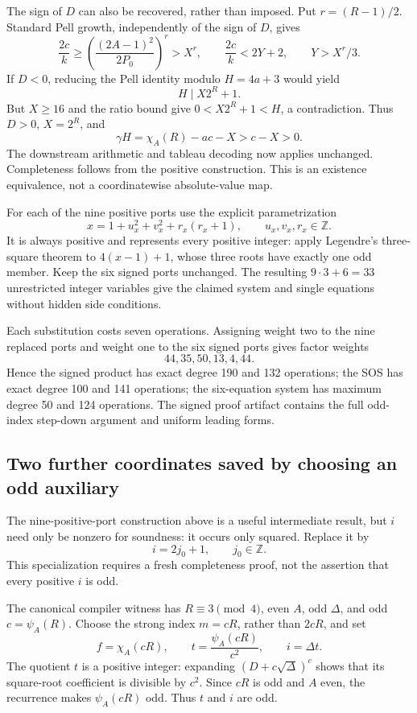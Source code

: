 \documentclass[11pt]{article}
\begin{document}
The sign of $D$ can also be recovered, rather than imposed. Put $r=(R-1)/2$. Standard Pell growth, independently of the sign of $D$, gives
\[
\frac{2c}{k}\ge
\left(\frac{(2A-1)^2}{2P_0}\right)^r>X^r,
\qquad \frac{2c}{k}<2Y+2,
\qquad Y>X^r/3.
\]
If $D<0$, reducing the Pell identity modulo $H=4a+3$ would yield
\[
H\mid X2^R+1.
\]
But $X\ge16$ and the ratio bound give $0<X2^R+1<H$, a contradiction. Thus $D>0$, $X=2^R$, and
\[
\gamma H=\chi_A(R)-ac-X>c-X>0.
\]
The downstream arithmetic and tableau decoding now applies unchanged. Completeness follows from the positive construction. This is an existence equivalence, not a coordinatewise absolute-value map.

For each of the nine positive ports use the explicit parametrization
\[
x=1+u_x^2+v_x^2+r_x(r_x+1),\qquad u_x,v_x,r_x\in\mathbb Z.
\]
It is always positive and represents every positive integer: apply Legendre's three-square theorem to $4(x-1)+1$, whose three roots have exactly one odd member. Keep the six signed ports unchanged. The resulting $9\cdot3+6=33$ unrestricted integer variables give the claimed system and single equations without hidden side conditions.

Each substitution costs seven operations. Assigning weight two to the nine replaced ports and weight one to the six signed ports gives factor weights
\[
44,35,50,13,4,44.
\]
Hence the signed product has exact degree 190 and 132 operations; the SOS has exact degree 100 and 141 operations; the six-equation system has maximum degree 50 and 124 operations. The signed proof artifact contains the full odd-index step-down argument and uniform leading forms.

\subsection{Two further coordinates saved by choosing an odd auxiliary}
The nine-positive-port construction above is a useful intermediate result, but $i$ need only be nonzero for soundness: it occurs only squared. Replace it by
\[
i=2j_0+1,\qquad j_0\in\mathbb Z.
\]
This specialization requires a fresh completeness proof, not the assertion that every positive $i$ is odd.

The canonical compiler witness has $R\equiv3\pmod4$, even $A$, odd $\Delta$, and odd $c=\psi_A(R)$. Choose the strong index $m=cR$, rather than $2cR$, and set
\[
f=\chi_A(cR),\qquad
 t=\frac{\psi_A(cR)}{c^2},\qquad i=\Delta t.
\]
The quotient $t$ is a positive integer: expanding $(D+c\sqrt\Delta)^c$ shows that its square-root coefficient is divisible by $c^2$. Since $cR$ is odd and $A$ even, the recurrence makes $\psi_A(cR)$ odd. Thus $t$ and $i$ are odd.
\end{document}
